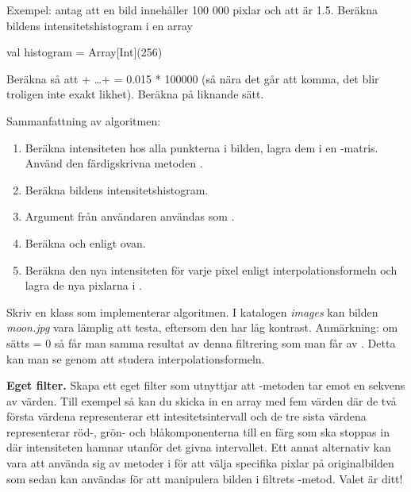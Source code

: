 Exempel: antag att en bild innehåller 100 000 pixlar och att  är 1.5. Beräkna bildens intensitetshistogram i en array
\begin{Code}
val histogram = Array[Int](256)
\end{Code}

Beräkna  så att  + \ldots +  = 0.015 * 100000 (så nära det går att komma, det blir troligen inte exakt likhet). Beräkna  på liknande sätt.

Sammanfattning av algoritmen:
\begin{enumerate}
	\item Beräkna intensiteten hos alla punkterna i bilden, lagra dem i en -matris. Använd den färdigskrivna metoden .
	\item Beräkna bildens intensitetshistogram.
	\item Argument från användaren användas som .
	\item Beräkna  och  enligt ovan.
	\item Beräkna den nya intensiteten för varje pixel enligt interpolationsformeln och lagra de nya pixlarna i .
\end{enumerate}
Skriv en klass  som implementerar algoritmen. I katalogen \emph{images} kan bilden \emph{moon.jpg} vara lämplig att testa, eftersom den har låg kontrast. Anmärkning: om  sätts = 0 så får man samma resultat av denna filtrering som man får av . Detta kan man se genom att studera interpolationsformeln.

\Task \textbf{Eget filter.} Skapa ett eget filter som utnyttjar att -metoden tar emot en sekvens av värden. Till exempel så kan du skicka in en array med fem värden där de två första värdena representerar ett intesitetsintervall och de tre sista värdena representerar röd-, grön- och blåkomponenterna till en färg som ska stoppas in där intensiteten hamnar utanför det givna intervallet. Ett annat alternativ kan vara att använda sig av metoder i  för att välja specifika pixlar på originalbilden som sedan kan användas för att manipulera bilden i filtrets -metod. Valet är ditt!
